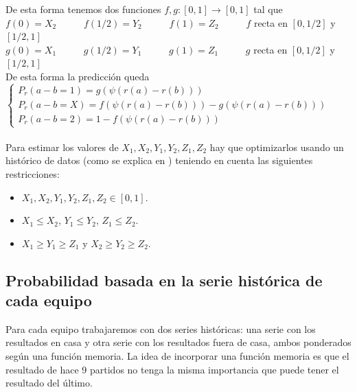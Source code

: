 De esta forma tenemos dos funciones $f,g:[0,1] \longrightarrow [0,1]$ tal que\\
$f(0)= X_{2}$ \ \ \ \ \ $f(1/2)= Y_{2}$ \ \ \ \ \ $f(1)= Z_{2}$ \ \ \ \ \ $f$ recta en $[0,1/2]$ y $[1/2,1]$\\
$g(0)= X_{1}$ \ \ \ \ \ $g(1/2)= Y_{1}$ \ \ \ \ \ $g(1)= Z_{1}$ \ \ \ \ \ $g$ recta en $[0,1/2]$ y $[1/2,1]$\\

De esta forma la predicción queda\\

$\begin{cases}
	P_{r}(a-b=1)=g(\psi (r(a)-r(b)))\\
	P_{r}(a-b=X)=f(\psi (r(a)-r(b)))-g(\psi (r(a)-r(b)))\\
	P_{r}(a-b=2)=1-f(\psi (r(a)-r(b)))
\end{cases}$
\ \\
\ \\
Para estimar los valores de $X_{1},X_{2},Y_{1},Y_{2},Z_{1},Z_{2}$ hay que optimizarlos usando un histórico de datos (como se explica en \cite[Capítulo 3]{tfgjavi}) teniendo en cuenta las siguientes restricciones:
\begin{itemize}
	\item $X_{1},X_{2},Y_{1},Y_{2},Z_{1},Z_{2} \in [0,1]$.
	\item $X_{1} \leq X_{2}$, $Y_{1} \leq Y_{2}$, $Z_{1} \leq Z_{2}$.
	\item $X_{1} \geq Y_{1} \geq Z_{1}$ y $X_{2} \geq Y_{2} \geq Z_{2}$.
\end{itemize}

\subsection{Probabilidad basada en la serie histórica de cada equipo}
Para cada equipo trabajaremos con dos series históricas: una serie con los resultados en casa y otra serie con los resultados fuera de casa, ambos ponderados según una función memoria. La idea de incorporar una función memoria es que el resultado de hace 9 partidos no tenga la misma importancia que puede tener el resultado del último.\\

\newpage

